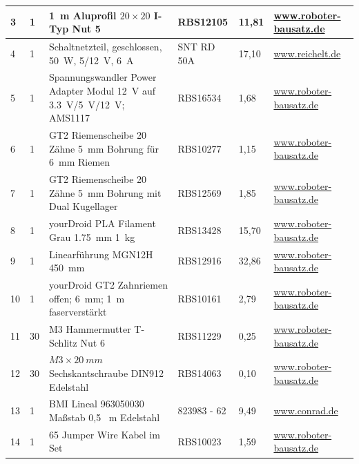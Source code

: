 \begin{center}
\begin{tabularx}{\textwidth}{|p{0.4cm}|p{0.4cm}|X|X|p{1cm}|X|}
		3 & 1 & 1\ m Aluprofil $20 \times 20$ I-Typ Nut 5 & RBS12105 & 11,81 & \href{https://www.roboter-bausatz.de/p/1-meter-aluprofil-20x20-i-typ-nut-5}{www.roboter-bausatz.de} \\ 
		\hline
		4 & 1 & Schaltnetzteil, geschlossen, 50\ W, 5/12\ V, 6\ A & SNT RD 50A
		& 17,10 & \href{https://www.reichelt.de}{www.reichelt.de} \\ 
		\hline
		5 & 1 & Spannungswandler Power Adapter Modul 12\ V auf 3.3\ V/5\ V/12\ V; AMS1117
		& RBS16534 & 1,68 & \href{https://www.roboter-bausatz.de/p/spannungswandler-power-adapter-modul-12v-auf-3.3v-5v-12v-ams1117}{www.roboter-bausatz.de} \\ 
		\hline
		6 & 1 & GT2 Riemenscheibe 20 Zähne 5\ mm Bohrung für 6\ mm Riemen & RBS10277 & 1,15 & \href{https://www.roboter-bausatz.de/p/gt2-riemenscheibe-20-zaehne-5mm-bohrung-fuer-6mm-riemen}{www.roboter-bausatz.de} \\ 
		\hline
		7 & 1 & GT2 Riemenscheibe 20 Zähne 5\ mm Bohrung mit Dual Kugellager & RBS12569 & 1,85 &	\href{https://www.roboter-bausatz.de/p/gt2-riemenscheibe-20-zaehne-5mm-bohrung-mit-dual-kugellager}{www.roboter-bausatz.de} \\ 
		\hline
		8 & 1 & yourDroid PLA Filament Grau 1.75\ mm 1\ kg  & RBS13428 & 15,70 & \href{https://www.roboter-bausatz.de/p/yourdroid-pla-filament-grau-1.75mm-1kg}{www.roboter-bausatz.de} \\ 
		\hline
		9 & 1 & Linearführung MGN12H 450\ mm & RBS12916 & 32,86 & \href{https://www.roboter-bausatz.de/p/linearfuehrung-mgn12h-450mm}{www.roboter-bausatz.de} \\
		\hline
		10 & 1 & yourDroid GT2 Zahnriemen offen; 6\ mm; 1\ m faserverstärkt & RBS10161 & 2,79 & \href{https://www.roboter-bausatz.de/p/yourdroid-gt2-zahnriemen-offen-6mm-1-meter-faserverstaerkt}{www.roboter-bausatz.de} \\
		\hline
		11 & 30 & M3 Hammermutter T-Schlitz Nut 6 &  RBS11229 & 0,25 & \href{https://www.roboter-bausatz.de/p/m3-hammermutter-t-schlitz-nut-6}{www.roboter-bausatz.de} \\
		\hline
		12 & 30 & $M3 \times 20 \ mm$ Sechskantschraube DIN912 Edelstahl & RBS14063 & 0,10 &
		\href{https://www.roboter-bausatz.de/p/m3x20mm-sechskantschraube-din912-edelstahl}{www.roboter-bausatz.de} \\
		\hline
		13 & 1 & BMI Lineal 963050030 Maßstab 0,5 \ m Edelstahl & 823983 - 62 & 9,49 & \href{https://www.conrad.de/}{www.conrad.de} \\
		\hline
		14 & 1 & 65 Jumper Wire Kabel im Set & RBS10023 & 1,59 & \href{https://www.roboter-bausatz.de/p/65-jumper-wire-kabel-im-set}{www.roboter-bausatz.de} \\

\end{tabularx}
\end{center}
